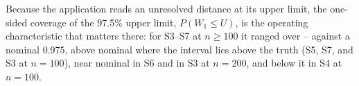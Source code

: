 \documentclass[AMA,Times1COL]{WileyNJDv5}
\begin{document}
Because the application reads an unresolved distance at its upper limit, the one-sided coverage of the 97.5\% upper limit, $P(W_1 \leq U)$, is the operating characteristic that matters there: for S3--S7 at $n \geq 100$ it ranged over -- against a nominal 0.975, above nominal where the interval lies above the truth (S5, S7, and S3 at $n = 100$), near nominal in S6 and in S3 at $n = 200$, and below it in S4 at $n = 100$.

\end{document}
